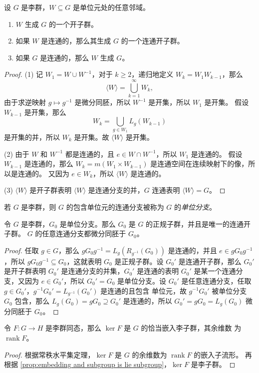 \documentclass[fontset=none]{Notes}
\DeclareMathOperator\rk{rank}
\begin{document}
\begin{proposition}
  设 $G$ 是李群，$W\subseteq G$ 是单位元处的任意邻域。
  \begin{enumerate}
    \item $W$ 生成 $G$ 的一个开子群。
    \item 如果 $W$ 是连通的，那么其生成 $G$ 的一个连通开子群。
    \item 如果 $G$ 是连通的，那么 $W$ 生成 $G$。
  \end{enumerate}
\end{proposition}
\begin{proof}
  (1) 记 $W_1=W\cup W^{-1}$，对于 $k\geq 2$，递归地定义 $W_k=W_1W_{k-1}$，那么
  \[
    \langle W\rangle=\bigcup_{k=1}^\infty W_k,
  \]
  由于求逆映射 $g\mapsto g^{-1}$ 是微分同胚，所以 $W^{-1}$ 是开集，所以 $W_1$ 是开集。
  假设 $W_{k-1}$ 是开集，那么
  \[
    W_k=\bigcup_{g\in W_1}L_g(W_{k-1})
  \]
  是开集的并，所以 $W_k$ 是开集。故 $\langle W\rangle$ 是开集。

  (2) 由于 $W$ 和 $W^{-1}$ 都是连通的，且 $e\in W\cap W^{-1}$，所以 $W_1$ 是连通的。
  假设 $W_{k-1}$ 是连通的，那么 $W_k=m(W_1\times W_{k-1})$ 是连通空间在连续映射下的像，所以是连通的。
  又因为 $e\in W_k$，所以 $\langle W\rangle$ 是连通的。

  (3) $\langle W\rangle$ 是开子群表明 $\langle W\rangle$ 是连通分支的并，$G$ 连通表明 $\langle W\rangle=G$。
\end{proof}

若 $G$ 是李群，则 $G$ 的包含单位元的连通分支被称为 $G$ 的\emph{单位分支}。

\begin{proposition}
  令 $G$ 是李群，$G_0$ 是单位分支。那么 $G_0$ 是 $G$ 的正规子群，并且是唯一的连通开子群。
  $G$ 的任意连通分支都微分同胚于 $G_0$。
\end{proposition}
\begin{proof}
  任取 $g\in G$，那么 $gG_0g^{-1}=L_g\left(R_{g^{-1}}(G_0)\right)$ 是连通的，并且 $e\in gG_0g^{-1}$，所以
  $gG_0g^{-1}\subseteq G_0$，这就表明 $G_0$ 是正规子群。设 $G_0'$ 是连通开子群，那么 $G_0'$ 是开子群表明
  $G_0'$ 是连通分支的并集，$G_0'$ 是连通的表明 $G_0'$ 是某一个连通分支，又因为 $e\in G_0'$，所以 $G_0'=G_0$
  是单位分支。设 $G_0'$ 是任意连通分支，任取 $g\in G_0'$，$g^{-1}G_0'=L_{g^{-1}}(G_0')$ 是连通的且包含
  单位元，故 $g^{-1}G_0'$ 被单位分支 $G_0$ 包含，那么 $L_{g}(G_0)=gG_0\supseteq G_0'$ 是连通的，所以
  $G_0'=gG_0=L_g(G_0)$ 微分同胚于 $G_0$。
\end{proof}
 
\begin{proposition}
  令 $F:G\to H$ 是李群同态，那么 $\ker F$ 是 $G$ 的恰当嵌入李子群，其余维数
  为 $\rk F$。
\end{proposition}
\begin{proof}
  根据常秩水平集定理，$\ker F$ 是 $G$ 的余维数为 $\rk F$ 的嵌入子流形。
  再根据 \autoref{prop:embedding and subgroup is lie subgroup}，$\ker F$
  是李子群。
\end{proof}
\end{document}
